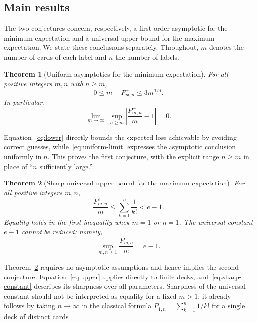 \documentclass[11pt,reqno]{amsart}
\numberwithin{equation}{section}
\newtheorem{theorem}{Theorem}[section]
\theoremstyle{remark}
\theoremstyle{definition}
\begin{document}
\subsection{Main results}
The two conjectures concern, respectively, a first-order asymptotic for the minimum expectation and a universal upper bound for the maximum expectation. We state these conclusions separately. Throughout, $m$ denotes the number of cards of each label and $n$ the number of labels.
\begin{theorem}[Uniform asymptotics for the minimum expectation]\label{thm:lower}
For all positive integers $m,n$ with $n\ge m$,
\begin{equation}\label{eq:lower}
 0\le m-P^-_{m,n}\le 3m^{3/4}.
\end{equation}
In particular,
\begin{equation}\label{eq:uniform-limit}
 \lim_{m\to\infty}\ \sup_{n\ge m}
 \left|\frac{P^-_{m,n}}{m}-1\right|=0.
\end{equation}
\end{theorem}
Equation~\eqref{eq:lower} directly bounds the expected loss achievable by avoiding correct guesses, while~\eqref{eq:uniform-limit} expresses the asymptotic conclusion uniformly in $n$. This proves the first conjecture, with the explicit range $n\ge m$ in place of ``$n$ sufficiently large.''
\begin{theorem}[Sharp universal upper bound for the maximum expectation]\label{thm:upper}
For all positive integers $m,n$,
\begin{equation}\label{eq:upper}
 \frac{P^+_{m,n}}{m}\le \sum_{k=1}^{n}\frac1{k!}<e-1.
\end{equation}
Equality holds in the first inequality when $m=1$ or $n=1$. The universal constant $e-1$ cannot be reduced: namely,
\begin{equation}\label{eq:sharp-constant}
 \sup_{m,n\ge1}\frac{P^+_{m,n}}{m}=e-1.
\end{equation}
\end{theorem}
Theorem~\ref{thm:upper} requires no asymptotic assumptions and hence implies the second conjecture. Equation~\eqref{eq:upper} applies directly to finite decks, and~\eqref{eq:sharp-constant} describes its sharpness over all parameters. Sharpness of the universal constant should not be interpreted as equality for a fixed $m>1$: it already follows by taking $n\to\infty$ in the classical formula $P^+_{1,n}=\sum_{k=1}^{n}1/k!$ for a single deck of distinct cards~\cite[Theorem~5]{DG}.
\end{document}
